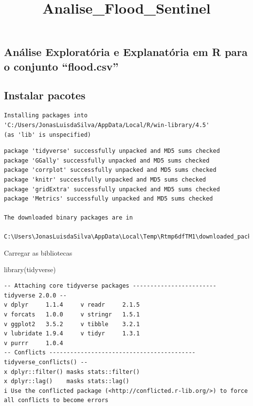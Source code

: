 \documentclass[
  letterpaper,
  DIV=11,
  numbers=noendperiod]{scrartcl}
\title{Analise\_Flood\_Sentinel}
\author{}
\date{}
\newenvironment{Shaded}{\begin{snugshade}}{\end{snugshade}}
\newcommand{\FunctionTok}[1]{\textcolor[rgb]{0.28,0.35,0.67}{#1}}
\newcommand{\NormalTok}[1]{\textcolor[rgb]{0.00,0.23,0.31}{#1}}
\begin{document}
\maketitle


\subsection{Análise Exploratória e Explanatória em R para o conjunto
``flood.csv''}\label{anuxe1lise-exploratuxf3ria-e-explanatuxf3ria-em-r-para-o-conjunto-flood.csv}

\subsection{Instalar pacotes}\label{instalar-pacotes}

\begin{verbatim}
Installing packages into 'C:/Users/JonasLuisdaSilva/AppData/Local/R/win-library/4.5'
(as 'lib' is unspecified)
\end{verbatim}

\begin{verbatim}
package 'tidyverse' successfully unpacked and MD5 sums checked
package 'GGally' successfully unpacked and MD5 sums checked
package 'corrplot' successfully unpacked and MD5 sums checked
package 'knitr' successfully unpacked and MD5 sums checked
package 'gridExtra' successfully unpacked and MD5 sums checked
package 'Metrics' successfully unpacked and MD5 sums checked

The downloaded binary packages are in
    C:\Users\JonasLuisdaSilva\AppData\Local\Temp\Rtmp6dfTM1\downloaded_packages
\end{verbatim}

Carregar as bibliotecas

\begin{Shaded}
\begin{Highlighting}[]
\FunctionTok{library}\NormalTok{(tidyverse)}
\end{Highlighting}
\end{Shaded}

\begin{verbatim}
-- Attaching core tidyverse packages ------------------------ tidyverse 2.0.0 --
v dplyr     1.1.4     v readr     2.1.5
v forcats   1.0.0     v stringr   1.5.1
v ggplot2   3.5.2     v tibble    3.2.1
v lubridate 1.9.4     v tidyr     1.3.1
v purrr     1.0.4     
-- Conflicts ------------------------------------------ tidyverse_conflicts() --
x dplyr::filter() masks stats::filter()
x dplyr::lag()    masks stats::lag()
i Use the conflicted package (<http://conflicted.r-lib.org/>) to force all conflicts to become errors
\end{verbatim}
\end{document}
